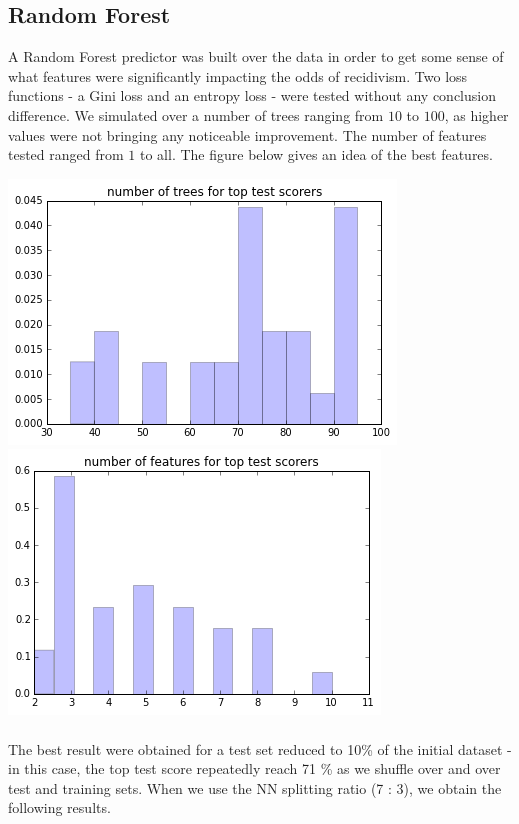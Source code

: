 \documentclass[a0,landscape]{a0poster}
\begin{document}
\begin{multicols}{4}

\section*{Random Forest}

A Random Forest predictor was built over the data in order to get some sense of what features were significantly impacting the odds of recidivism. Two loss functions - a Gini loss and an entropy loss - were tested without any conclusion difference. We simulated over a number of trees ranging from $10$ to $100$, as higher values were not bringing any noticeable improvement. The number of features tested ranged from $1$ to all. The figure below gives an idea of the best features.

\begin{center}\vspace{1cm}
  \includegraphics[width=.45\linewidth]{number_forest78.png}
  \includegraphics[width=.45\linewidth]{number_features78.png}
\end{center}\vspace{1cm}

\paragraph{}
The best result were obtained for a test set reduced to 10\% of the initial dataset - in this case, the top test score repeatedly reach 71 \% as we shuffle over and over test and training sets. When we use the NN splitting ratio (7 : 3), we obtain the following results.


\end{multicols}
\end{document}
